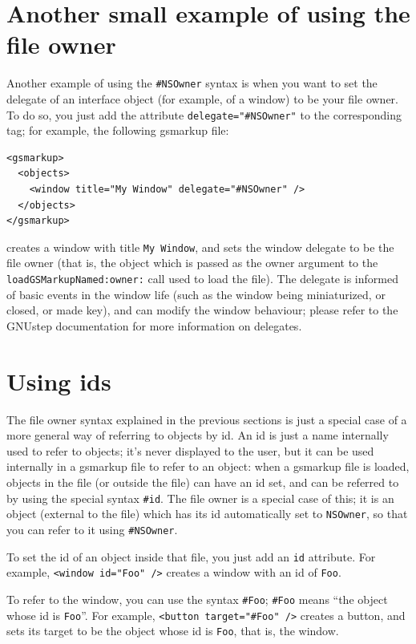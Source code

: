 \documentclass[a4paper]{article}
\begin{document}
\section{Another small example of using the file owner}
Another example of using the \texttt{\#NSOwner} syntax is when you
want to set the delegate of an interface object (for example, of a
window) to be your file owner.  To do so, you just add the attribute
\texttt{delegate="\#NSOwner"} to the corresponding tag; for example,
the following gsmarkup file:
\begin{verbatim}
<gsmarkup>
  <objects>
    <window title="My Window" delegate="#NSOwner" />
  </objects>
</gsmarkup>
\end{verbatim}
creates a window with title \texttt{My Window}, and sets the window
delegate to be the file owner (that is, the object which is passed as
the owner argument to the \texttt{loadGSMarkupNamed:owner:} call used
to load the file).  The delegate is informed of basic events in the
window life (such as the window being miniaturized, or closed, or made
key), and can modify the window behaviour; please refer to the GNUstep
documentation for more information on delegates.

\section{Using ids}
The file owner syntax explained in the previous sections is just a
special case of a more general way of referring to objects by id.  An
id is just a name internally used to refer to objects; it's never
displayed to the user, but it can be used internally in a gsmarkup
file to refer to an object: when a gsmarkup file is loaded, objects in
the file (or outside the file) can have an id set, and can be referred
to by using the special syntax \texttt{\#id}.  The file owner is a
special case of this; it is an object (external to the file) which has
its id automatically set to \texttt{NSOwner}, so that you can refer to
it using \texttt{\#NSOwner}.

To set the id of an object inside that file, you just add an
\texttt{id} attribute.  For example, \texttt{<window id="Foo" />}
creates a window with an id of \texttt{Foo}.

To refer to the window, you can use the syntax \texttt{\#Foo};
\texttt{\#Foo} means ``the object whose id is \texttt{Foo}''.  For example,
\texttt{<button target="\#Foo" />} creates a button, and sets its target 
to be the object whose id is \texttt{Foo}, that is, the window.
\end{document}
